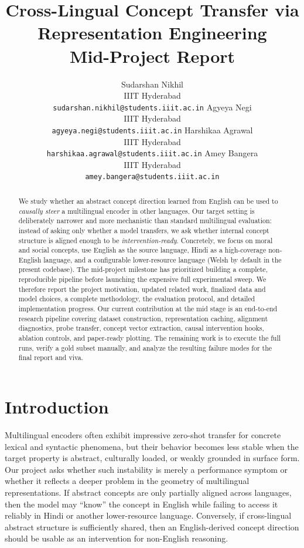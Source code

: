 \documentclass[11pt]{article}
\title{Cross-Lingual Concept Transfer via Representation Engineering\\Mid-Project Report}
\author{Sudarshan Nikhil \\
  IIIT Hyderabad \\
  \texttt{sudarshan.nikhil@students.iiit.ac.in}
  \And
  Agyeya Negi \\
  IIIT Hyderabad \\
  \texttt{agyeya.negi@students.iiit.ac.in}
  \And
  Harshikaa Agrawal \\
  IIIT Hyderabad \\
  \texttt{harshikaa.agrawal@students.iiit.ac.in}
  \And
  Amey Bangera \\
  IIIT Hyderabad \\
  \texttt{amey.bangera@students.iiit.ac.in}}
\begin{document}
\maketitle

\begin{abstract}
We study whether an abstract concept direction learned from English can be used to \emph{causally steer} a multilingual encoder in other languages. Our target setting is deliberately narrower and more mechanistic than standard multilingual evaluation: instead of asking only whether a model transfers, we ask whether internal concept structure is aligned enough to be \emph{intervention-ready}. Concretely, we focus on moral and social concepts, use English as the source language, Hindi as a high-coverage non-English language, and a configurable lower-resource language (Welsh by default in the present codebase). The mid-project milestone has prioritized building a complete, reproducible pipeline before launching the expensive full experimental sweep. We therefore report the project motivation, updated related work, finalized data and model choices, a complete methodology, the evaluation protocol, and detailed implementation progress. Our current contribution at the mid stage is an end-to-end research pipeline covering dataset construction, representation caching, alignment diagnostics, probe transfer, concept vector extraction, causal intervention hooks, ablation controls, and paper-ready plotting. The remaining work is to execute the full runs, verify a gold subset manually, and analyze the resulting failure modes for the final report and viva.
\end{abstract}

\section{Introduction}
Multilingual encoders often exhibit impressive zero-shot transfer for concrete lexical and syntactic phenomena, but their behavior becomes less stable when the target property is abstract, culturally loaded, or weakly grounded in surface form. Our project asks whether such instability is merely a performance symptom or whether it reflects a deeper problem in the geometry of multilingual representations. If abstract concepts are only partially aligned across languages, then the model may ``know'' the concept in English while failing to access it reliably in Hindi or another lower-resource language. Conversely, if cross-lingual abstract structure is sufficiently shared, then an English-derived concept direction should be usable as an intervention for non-English reasoning.
\end{document}
